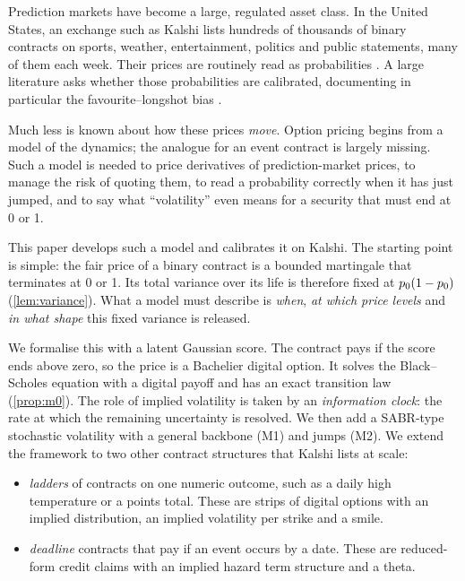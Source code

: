 Prediction markets have become a large, regulated asset class. In the United States, an exchange
such as Kalshi lists hundreds of thousands of binary contracts on sports, weather, entertainment,
politics and public statements, many of them each week. Their prices are routinely read as
probabilities \citep{wolferszitzewitz2004,wolferszitzewitz2006}. A large literature asks whether
those probabilities are calibrated, documenting in particular the favourite--longshot bias
\citep{griffith1949,thalerziemba1988,snowbergwolfers2010,burgi2025}.

Much less is known about how these prices \emph{move}. Option pricing begins from a model of the
dynamics; the analogue for an event contract is largely missing. Such a model is needed to price
derivatives of prediction-market prices, to manage the risk of quoting them, to read a probability
correctly when it has just jumped, and to say what ``volatility'' even means for a security that
must end at 0 or 1.

This paper develops such a model and calibrates it on Kalshi. The starting point is simple: the
fair price of a binary contract is a bounded martingale that terminates at 0 or 1. Its total
variance over its life is therefore fixed at $p_0(1-p_0)$ (\cref{lem:variance}). What a model
must describe is \emph{when}, \emph{at which price levels} and \emph{in what shape} this fixed
variance is released.

We formalise this with a latent Gaussian score. The contract pays if the score ends above zero, so
the price is a Bachelier digital option. It solves the Black--Scholes equation with a digital payoff
and has an exact transition law (\cref{prop:m0}). The role of implied volatility is taken by an
\emph{information clock}: the rate at which the remaining uncertainty is resolved. We then add a
SABR-type stochastic volatility with a general backbone (M1) and jumps (M2). We extend the framework
to two other contract structures that Kalshi lists at scale:
\begin{itemize}
  \item \emph{ladders} of contracts on one numeric outcome, such as a daily high temperature or a
  points total. These are strips of digital options with an implied distribution, an implied
  volatility per strike and a smile.
  \item \emph{deadline} contracts that pay if an event occurs by a date. These are reduced-form
  credit claims with an implied hazard term structure and a theta.
\end{itemize}


